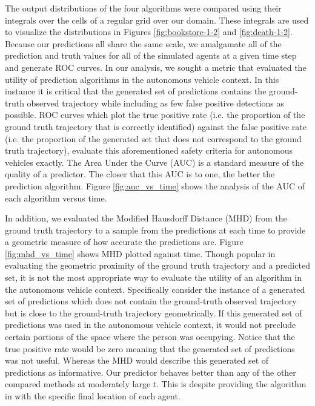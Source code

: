 \documentclass[letterpaper,10pt,conference]{ieeeconf}
\begin{document}
The output distributions of the four algorithms were compared using their integrals over the cells of a regular grid over our domain. 
These integrals are used to visualize the distributions in Figures \ref{fig:bookstore-1-2} and \ref{fig:death-1-2}.
Because our predictions all share the same scale, we amalgamate all of the prediction and truth values for all of the simulated agents at a given time step and generate ROC curves.
In our analysis, we sought a metric that evaluated the utility of prediction algorithms in the autonomous vehicle context. 
	In this instance it is critical that the generated set of predictions contains the ground-truth observed trajectory while including as few false positive detections as possible.
	ROC curves which plot the true positive rate (i.e. the proportion of the ground truth trajectory that is correctly identified) against the false positive rate (i.e. the proportion of the generated set that does not correspond to the ground truth trajectory), evaluate this aforementioned safety criteria for autonomous vehicles exactly. 
	The Area Under the Curve (AUC) is a standard measure of the quality of a predictor.  
	The closer that this AUC is to one, the better the prediction algorithm.
	Figure \ref{fig:auc_vs_time} shows the analysis of the AUC of each algorithm versus time. 
	
	In addition, we evaluated the Modified Hausdorff Distance (MHD) from the ground truth trajectory to a sample from the predictions at each time to provide a geometric measure of how accurate the predictions are. 
	Figure \ref{fig:mhd_vs_time} shows MHD plotted against time.
	Though popular in evaluating the geometric proximity of the ground truth trajectory and a predicted set, it is not the most appropriate way to evaluate the utility of an algorithm in the autonomous vehicle context. 
	Specifically consider the instance of a generated set of predictions which does not contain the ground-truth observed trajectory but is close to the ground-truth trajectory geometrically. 
	If this generated set of predictions was used in the autonomous vehicle context, it would not preclude certain portions of the space where the person was occupying. 
	Notice that the true positive rate would be zero meaning that the generated set of predictions was not useful.
	Whereas the MHD would describe this generated set of predictions as informative.
Our predictor behaves better than any of the other compared methods at moderately large $t$.
This is despite providing the algorithm in \cite{Kitani2012} with the specific final location of each agent.
\end{document}
